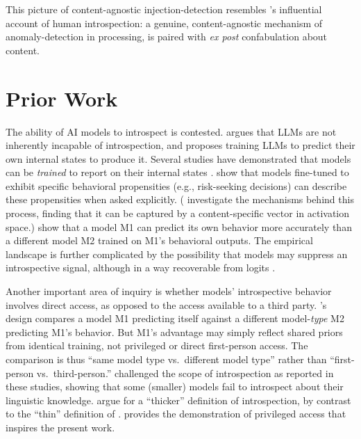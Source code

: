 \documentclass{article}
\begin{document}
This picture of content-agnostic injection-detection resembles \citet{nisbett_telling_1977}'s influential account of human introspection: a genuine, content-agnostic mechanism of anomaly-detection in processing, is paired with \emph{ex post} confabulation about content.

\vspace{-.06in}
\section{Prior Work}

The ability of AI models to introspect is contested.
\citet{long_introspective_2023} argues that LLMs are not inherently incapable of introspection, and proposes training LLMs to predict their own internal states to produce it. Several studies have demonstrated that models can be \emph{trained} to report on their internal states \citep{plunkett_self_2025,li_training_2025}.
 \citet{betley2025tell} show that models fine-tuned to exhibit specific behavioral propensities (e.g., risk-seeking decisions) can describe these propensities when asked explicitly. (\citet{bozoukov_emergent_2025} investigate the mechanisms behind this process, finding that it can be captured by a content-specific vector in activation space.)  \citet{binder2025looking} show that a model M1 can predict its own behavior more accurately than a different model M2 trained on M1's behavioral outputs. The empirical landscape is further complicated by the possibility that models may suppress an introspective signal, although in a way recoverable from logits \citet{vogel_small_2025}.
 


Another important area of inquiry is whether models' introspective behavior involves direct access, as opposed to the access available to a third party. \citeauthor{binder2025looking}'s design compares a model M1 predicting itself against a different model-\emph{type} M2 predicting M1's behavior. But M1's advantage may simply reflect shared priors from identical training, not privileged or direct first-person access. The comparison is thus ``same model type vs.\ different model type'' rather than ``first-person vs.\ third-person.''
\citet{song_language_2025} challenged the scope of introspection as reported in these studies, showing that some (smaller) models fail to introspect about their linguistic knowledge. \citet{song_privileged_2025} argue for a ``thicker'' definition of introspection, by contrast to the ``thin'' definition of \citet{comsa2025}.
\citet{lindsey_introspection_2025} provides the demonstration of privileged access that \citep[together with the third-person paradigm of][]{song_language_2025} inspires the present work.
\end{document}
